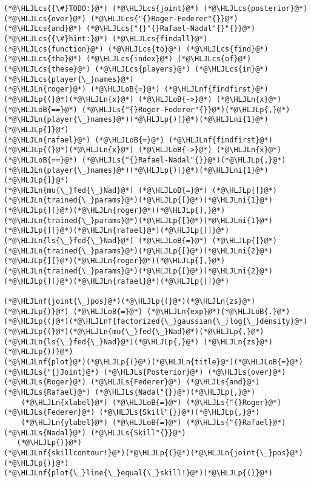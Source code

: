 \documentclass[12pt,a4paper]{article}
\newcommand{\HLJLn}[1]{#1}
\newcommand{\HLJLnf}[1]{\textcolor[RGB]{66,102,213}{#1}}
\newcommand{\HLJLs}[1]{\textcolor[RGB]{201,61,57}{#1}}
\newcommand{\HLJLni}[1]{\textcolor[RGB]{59,151,46}{#1}}
\newcommand{\HLJLoB}[1]{\textcolor[RGB]{102,102,102}{\textbf{#1}}}
\newcommand{\HLJLp}[1]{#1}
\newcommand{\HLJLcs}[1]{\textcolor[RGB]{153,153,119}{\textit{#1}}}
\begin{document}
\begin{lstlisting}
(*@\HLJLcs{{\#}TODO:}@*) (*@\HLJLcs{joint}@*) (*@\HLJLcs{posterior}@*) (*@\HLJLcs{over}@*) (*@\HLJLcs{"{}Roger-Federer"{}}@*) (*@\HLJLcs{and}@*) (*@\HLJLcs{"{}"{}Rafael-Nadal"{}"{}}@*)
(*@\HLJLcs{{\#}hint:}@*) (*@\HLJLcs{findall}@*) (*@\HLJLcs{function}@*) (*@\HLJLcs{to}@*) (*@\HLJLcs{find}@*) (*@\HLJLcs{the}@*) (*@\HLJLcs{index}@*) (*@\HLJLcs{of}@*) (*@\HLJLcs{these}@*) (*@\HLJLcs{players}@*) (*@\HLJLcs{in}@*) (*@\HLJLcs{player{\_}names}@*)
(*@\HLJLn{roger}@*) (*@\HLJLoB{=}@*) (*@\HLJLnf{findfirst}@*)(*@\HLJLp{(}@*)(*@\HLJLn{x}@*) (*@\HLJLoB{->}@*) (*@\HLJLn{x}@*) (*@\HLJLoB{==}@*) (*@\HLJLs{"{}Roger-Federer"{}}@*)(*@\HLJLp{,}@*) (*@\HLJLn{player{\_}names}@*)(*@\HLJLp{)[}@*)(*@\HLJLni{1}@*)(*@\HLJLp{]}@*)
(*@\HLJLn{rafael}@*) (*@\HLJLoB{=}@*) (*@\HLJLnf{findfirst}@*)(*@\HLJLp{(}@*)(*@\HLJLn{x}@*) (*@\HLJLoB{->}@*) (*@\HLJLn{x}@*) (*@\HLJLoB{==}@*) (*@\HLJLs{"{}Rafael-Nadal"{}}@*)(*@\HLJLp{,}@*) (*@\HLJLn{player{\_}names}@*)(*@\HLJLp{)[}@*)(*@\HLJLni{1}@*)(*@\HLJLp{]}@*)
(*@\HLJLn{mu{\_}fed{\_}Nad}@*) (*@\HLJLoB{=}@*) (*@\HLJLp{[}@*)(*@\HLJLn{trained{\_}params}@*)(*@\HLJLp{[}@*)(*@\HLJLni{1}@*)(*@\HLJLp{][}@*)(*@\HLJLn{roger}@*)(*@\HLJLp{],}@*) (*@\HLJLn{trained{\_}params}@*)(*@\HLJLp{[}@*)(*@\HLJLni{1}@*)(*@\HLJLp{][}@*)(*@\HLJLn{rafael}@*)(*@\HLJLp{]]}@*)
(*@\HLJLn{ls{\_}fed{\_}Nad}@*) (*@\HLJLoB{=}@*) (*@\HLJLp{[}@*)(*@\HLJLn{trained{\_}params}@*)(*@\HLJLp{[}@*)(*@\HLJLni{2}@*)(*@\HLJLp{][}@*)(*@\HLJLn{roger}@*)(*@\HLJLp{],}@*) (*@\HLJLn{trained{\_}params}@*)(*@\HLJLp{[}@*)(*@\HLJLni{2}@*)(*@\HLJLp{][}@*)(*@\HLJLn{rafael}@*)(*@\HLJLp{]]}@*)

(*@\HLJLnf{joint{\_}pos}@*)(*@\HLJLp{(}@*)(*@\HLJLn{zs}@*)(*@\HLJLp{)}@*) (*@\HLJLoB{=}@*) (*@\HLJLn{exp}@*)(*@\HLJLoB{.}@*)(*@\HLJLp{(}@*)(*@\HLJLnf{factorized{\_}gaussian{\_}log{\_}density}@*)(*@\HLJLp{(}@*)(*@\HLJLn{mu{\_}fed{\_}Nad}@*)(*@\HLJLp{,}@*) (*@\HLJLn{ls{\_}fed{\_}Nad}@*)(*@\HLJLp{,}@*) (*@\HLJLn{zs}@*)(*@\HLJLp{))}@*)
(*@\HLJLnf{plot}@*)(*@\HLJLp{(}@*)(*@\HLJLn{title}@*)(*@\HLJLoB{=}@*)(*@\HLJLs{"{}Joint}@*) (*@\HLJLs{Posterior}@*) (*@\HLJLs{over}@*) (*@\HLJLs{Roger}@*) (*@\HLJLs{Federer}@*) (*@\HLJLs{and}@*) (*@\HLJLs{Rafael}@*) (*@\HLJLs{Nadal"{}}@*)(*@\HLJLp{,}@*)
    (*@\HLJLn{xlabel}@*) (*@\HLJLoB{=}@*) (*@\HLJLs{"{}Roger}@*) (*@\HLJLs{Federer}@*) (*@\HLJLs{Skill"{}}@*)(*@\HLJLp{,}@*)
    (*@\HLJLn{ylabel}@*) (*@\HLJLoB{=}@*) (*@\HLJLs{"{}Rafael}@*) (*@\HLJLs{Nadal}@*) (*@\HLJLs{Skill"{}}@*)
   (*@\HLJLp{)}@*)
(*@\HLJLnf{skillcontour!}@*)(*@\HLJLp{(}@*)(*@\HLJLn{joint{\_}pos}@*)(*@\HLJLp{)}@*)
(*@\HLJLnf{plot{\_}line{\_}equal{\_}skill!}@*)(*@\HLJLp{()}@*)
\end{lstlisting}
\end{document}
